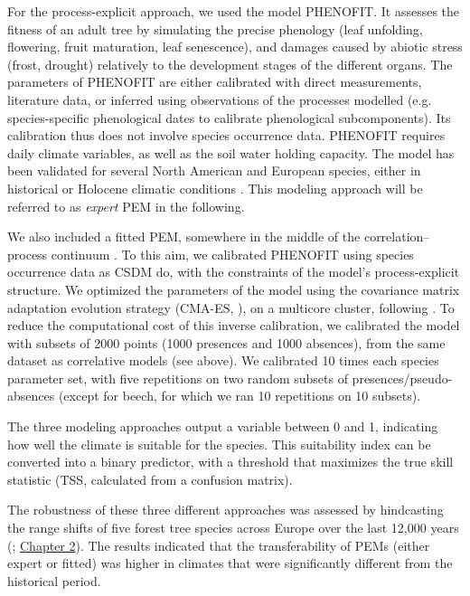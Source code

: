 For the process-explicit approach, we used the model PHENOFIT. It assesses the fitness of an adult tree by simulating the precise phenology (leaf unfolding, flowering, fruit maturation, leaf senescence), and damages caused by abiotic stress (frost, drought) relatively to the development stages of the different organs. The parameters of PHENOFIT are either calibrated with direct measurements, literature data, or inferred  using observations of the processes modelled (e.g. species-specific phenological dates to calibrate phenological subcomponents). Its calibration thus does not involve species occurrence data. PHENOFIT requires daily climate variables, as well as the soil water holding capacity. The model has been validated for several North American and European species, either in historical or Holocene climatic conditions \citep{Morin2007, Saltre2013, Duputie2015, Gauzere2020, VanderMeersch2024}. This modeling approach will be referred to as \emph{expert} PEM in the following.

We also included a fitted PEM, somewhere in the middle of the correlation–process continuum \citep{Dormann2012}. To this aim, we calibrated PHENOFIT using species occurrence data as CSDM do, with the constraints of the model's process-explicit structure. We optimized the parameters of the model using the covariance matrix adaptation evolution strategy (CMA-ES, \citep{Hansen2001}), on a multicore cluster, following \citet{VanderMeersch2023}. To reduce the computational cost of this inverse calibration, we calibrated the model with subsets of 2000 points (1000 presences and 1000 absences), from the same dataset as correlative models (see above). We calibrated 10 times each species parameter set, with five repetitions on two random subsets of presences/pseudo-absences (except for beech, for which we ran 10 repetitions on 10 subsets).

The three modeling approaches output a variable between 0 and 1, indicating how well the climate is suitable for the species. This suitability index can be converted into a binary predictor, with a threshold that maximizes the true skill statistic (TSS, calculated from a confusion matrix). 

The robustness of these three different approaches was assessed by hindcasting the range shifts of five forest tree species across Europe over the last 12,000 years (\citealp{VanderMeersch2024}; \hyperref[chapter2]{Chapter 2}). The results indicated that the transferability of PEMs (either expert or fitted) was higher in climates that were significantly different from the historical period.

